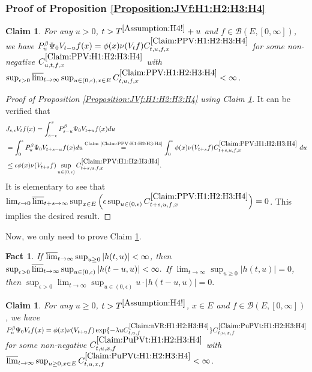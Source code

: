 \documentclass[12pt,a4paper]{amsart}
\numberwithin{equation}{section}
\theoremstyle{plain}
\newtheorem{fact}[thm]{Fact}
\newtheorem{claim}[thm]{Claim}
\theoremstyle{definition}
\theoremstyle{remark}
\newcounter{N}
\newcounter{n}[N]
\begin{document}
\subsubsection{Proof of Proposition \ref{Proposition:JVf:H1:H2:H3:H4}} \label{sec:JVf}
\begin{claim} \label{Claim:PPV:H1:H2:H3:H4} 
For any $u>0$, $t> T^{\ref{Assumption:H4!}} + u$ and $f \in \mathcal B(E,[0,\infty])$, we have 
$P_u^\beta \Psi_0 V_{t-u} f(x) 
 = \phi(x)\nu(V_tf) C^{\ref{Claim:PPV:H1:H2:H3:H4}}_{t,u,f,x}$
 for some non-negative $C^{\ref{Claim:PPV:H1:H2:H3:H4}}_{u,t,f,x}$ with $\sup_{\epsilon > 0} \varlimsup_{t\to \infty} \sup_{u \in (0,\epsilon), x\in E} C^{\ref{Claim:PPV:H1:H2:H3:H4}}_{t,u,f,x} < \infty$.
\end{claim}
\begin{proof}[{Proof of Proposition \ref{Proposition:JVf:H1:H2:H3:H4} using Claim \ref{Claim:PPV:H1:H2:H3:H4}}]
It can be verified that
\begin{align}
 &J_{s,\epsilon}V_tf(x) 
 = \int_{s-\epsilon}^s P_{s-u}^\beta \Psi_0 V_{t+u} f(x)du 
 \\&= \int_0^\epsilon P_u^\beta \Psi_0 V_{t+s - u}f(x) du
 \overset{\text{Claim \ref{Claim:PPV:H1:H2:H3:H4}}}= \int_0^\epsilon \phi(x) \nu(V_{t+s}f) C^{\ref{Claim:PPV:H1:H2:H3:H4}}_{t+s,u,f,x}~du
 \\&\leq \epsilon \phi(x)\nu(V_{t+s}f) \sup_{u\in (0,\epsilon)} C^{\ref{Claim:PPV:H1:H2:H3:H4}}_{t+s,u,f,x}.
 \end{align}
 It is elementary to see that $\lim_{\epsilon \to 0}\varlimsup_{t+s \to \infty}\sup_{x\in E}\Big(\epsilon \sup_{u\in (0,\epsilon)} C^{\ref{Claim:PPV:H1:H2:H3:H4}}_{t+s,u,f,x}\Big) = 0$.
This implies the desired result.
\end{proof}
Now, we only need to prove Claim \ref{Claim:PPV:H1:H2:H3:H4}.
\begin{fact} \label{Fact:TO!} 
If $\varlimsup_{t\to \infty} \sup_{u\geq 0} |h(t,u)| < \infty$, then $\sup_{\epsilon > 0} \varlimsup_{t\to \infty} \sup_{u \in (0,\epsilon)} |h(t-u,u)| < \infty.$
If $\lim_{t\to \infty} \sup_{u \geq 0} |h(t,u)| = 0$, then 
$
 \sup_{\epsilon > 0} \lim_{t\to \infty} \sup_{u \in (0,\epsilon)} u\cdot |h(t-u,u)| = 0.
$
\end{fact}
\begin{claim} \label{Claim:PuPVt:H1:H2:H3:H4} 
For any $u\geq 0$, $t>T^{\ref{Assumption:H4!}}$, $x\in E$ and $f\in \mathcal B(E,[0,\infty])$, we have 
$
 P_u^\beta \Psi_0 V_{t} f(x) 
 = \phi(x)\nu(V_{t+u}f) \exp\{-\lambda u C^{\ref{Claim:nVR:H1:H2:H3:H4}}_{t,u,f} \} C^{\ref{Claim:PuPVt:H1:H2:H3:H4}}_{t,u,x,f}
 $
 for some non-negative $C^{\ref{Claim:PuPVt:H1:H2:H3:H4}}_{t,u,x,f}$ with $\varlimsup_{t\to \infty} \sup_{u\geq 0, x\in E} C^{\ref{Claim:PuPVt:H1:H2:H3:H4}}_{t,u,x,f} < \infty$.
\end{claim}
\end{document}
